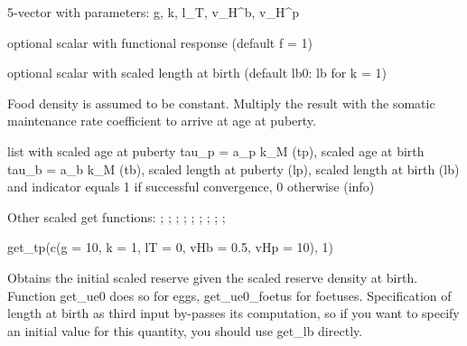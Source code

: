 \documentclass[a4paper]{book}
\begin{document}
%
\begin{Arguments}
\begin{ldescription}
\item[\code{pars}] 5-vector with parameters: g, k, l\_T, v\_H\textasciicircum{}b, v\_H\textasciicircum{}p

\item[\code{f}] optional scalar with functional response (default f = 1)

\item[\code{lb0}] optional scalar with scaled length at birth (default lb0: lb for k = 1)
\end{ldescription}
\end{Arguments}
%
\begin{Details}\relax
Food density is assumed to be constant. Multiply the result with the
somatic maintenance rate coefficient to arrive at age at puberty.
\end{Details}
%
\begin{Value}
list with scaled age at puberty tau\_p = a\_p k\_M (tp),
scaled age at birth tau\_b = a\_b k\_M (tb),
scaled length at puberty (lp), scaled length at birth (lb)
and indicator equals 1 if successful convergence, 0 otherwise (info)
\end{Value}
%
\begin{SeeAlso}\relax
Other scaled get functions: ;
; ;
; ;
; ;
;
;
\end{SeeAlso}
%
\begin{Examples}
\begin{ExampleCode}
get_tp(c(g = 10, k = 1, lT = 0, vHb = 0.5, vHp = 10), 1)
\end{ExampleCode}
\end{Examples}
%
\begin{Description}\relax
Obtains the initial scaled reserve given the scaled reserve density at birth.
Function get\_ue0 does so for eggs, get\_ue0\_foetus for foetuses.
Specification of length at birth as third input by-passes its computation,
so if you want to specify an initial value for this quantity, you should use get\_lb directly.
\end{Description}
\end{document}
